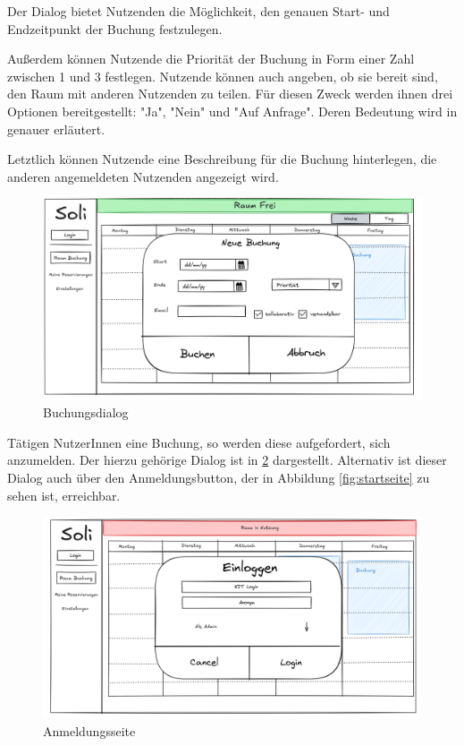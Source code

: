 Der Dialog bietet Nutzenden die Möglichkeit, den genauen Start- und Endzeitpunkt der Buchung festzulegen.

Außerdem können Nutzende die Priorität der Buchung in Form einer Zahl zwischen 1 und 3 festlegen.
Nutzende können auch angeben, ob sie bereit sind, den Raum mit anderen Nutzenden zu teilen.
Für diesen Zweck werden ihnen drei Optionen bereitgestellt: "Ja", "Nein" und "Auf Anfrage".
Deren Bedeutung wird in  genauer erläutert.

Letztlich können Nutzende eine Beschreibung für die Buchung hinterlegen, die anderen angemeldeten Nutzenden angezeigt wird.
\begin{figure}[ht]
    \centering
    \includegraphics[scale=0.15]{figures/ui/buchungsdialog}
    \caption{Buchungsdialog}
    \label{fig:buchung}
\end{figure}
\clearpage

Tätigen NutzerInnen eine Buchung, so werden diese aufgefordert, sich anzumelden.
Der hierzu gehörige Dialog ist in \ref{fig:login} dargestellt.
Alternativ ist dieser Dialog auch über den Anmeldungsbutton, der in Abbildung \ref{fig:startseite} zu sehen ist, erreichbar.
\begin{figure}[ht]
    \centering
    \includegraphics[scale=0.15]{figures/ui/anmeldungsseite}
    \caption{Anmeldungsseite}
    \label{fig:login}
\end{figure}
\clearpage

